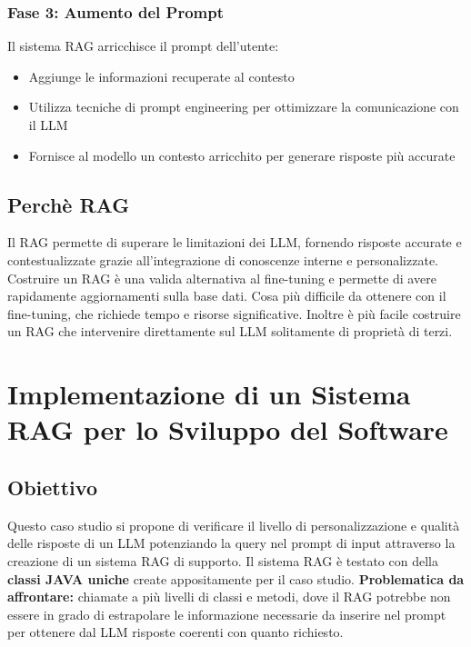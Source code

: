 \documentclass[12pt,a4paper,openright,twoside]{book}
\begin{document}
\subsection{Fase 3: Aumento del Prompt}
Il sistema RAG arricchisce il prompt dell'utente:
\begin{itemize}
    \item Aggiunge le informazioni recuperate al contesto
    \item Utilizza tecniche di prompt engineering per ottimizzare la comunicazione con il LLM
    \item Fornisce al modello un contesto arricchito per generare risposte più accurate
\end{itemize}

\section{Perchè RAG}
Il RAG permette di superare le limitazioni dei LLM, fornendo risposte accurate e contestualizzate 
grazie all'integrazione di conoscenze interne e personalizzate.
Costruire un RAG è una valida alternativa al fine-tuning e permette di avere rapidamente aggiornamenti sulla base dati.
Cosa più difficile da ottenere con il fine-tuning, che richiede tempo e risorse significative.
Inoltre è più facile costruire un RAG che intervenire direttamente sul LLM solitamente di proprietà di terzi.

\chapter{Implementazione di un Sistema RAG per lo Sviluppo del Software}

\section{Obiettivo}

Questo caso studio si propone di verificare il livello di personalizzazione e qualità delle risposte di un LLM potenziando la query nel prompt di input 
attraverso la creazione di un sistema RAG di supporto.
Il sistema RAG è testato con della \textbf{classi JAVA uniche} create appositamente per il caso studio.
\newline\textbf{Problematica da affrontare:} chiamate a più livelli di classi e metodi, dove il RAG potrebbe non essere in grado di estrapolare
le informazione necessarie da inserire nel prompt per ottenere dal LLM risposte coerenti con quanto richiesto.
\end{document}
